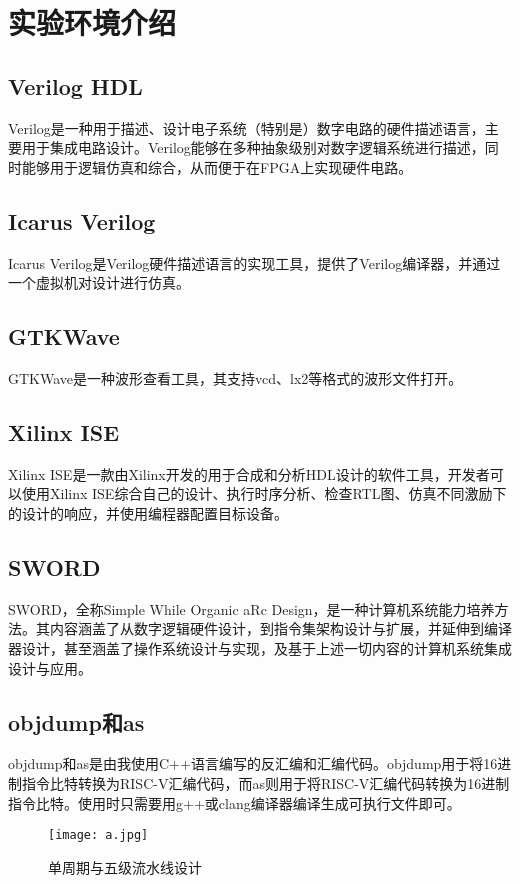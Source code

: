 \documentclass{article}
\begin{document}
    \section{实验环境介绍}
        \subsection{Verilog HDL}
        Verilog是一种用于描述、设计电子系统（特别是）数字电路的硬件描述语言，主要用于集成电路设计。Verilog能够在多种抽象级别对数字逻辑系统进行描述，同时能够用于逻辑仿真和综合，从而便于在FPGA上实现硬件电路。\cite{ref4}
        \subsection{Icarus Verilog}
        Icarus Verilog是Verilog硬件描述语言的实现工具，提供了Verilog编译器，并通过一个虚拟机对设计进行仿真。\cite{ref5}
        \subsection{GTKWave}
        GTKWave是一种波形查看工具，其支持vcd、lx2等格式的波形文件打开。
        \subsection{Xilinx ISE}
        Xilinx ISE是一款由Xilinx开发的用于合成和分析HDL设计的软件工具，开发者可以使用Xilinx ISE综合自己的设计、执行时序分析、检查RTL图、仿真不同激励下的设计的响应，并使用编程器配置目标设备。\cite{ref6}
        \subsection{SWORD}
        SWORD，全称Simple While Organic aRc Design，是一种计算机系统能力培养方法。其内容涵盖了从数字逻辑硬件设计，到指令集架构设计与扩展，并延伸到编译器设计，甚至涵盖了操作系统设计与实现，及基于上述一切内容的计算机系统集成设计与应用。\cite{ref7}
        \subsection{objdump和as}
        objdump和as是由我使用C++语言编写的反汇编和汇编代码。objdump用于将16进制指令比特转换为RISC-V汇编代码，而as则用于将RISC-V汇编代码转换为16进制指令比特。使用时只需要用g++或clang编译器编译生成可执行文件即可。

    \newpage{}
    \begin{figure}[ht]
        \centering
        \texttt{[image: a.jpg]}
        \caption{单周期与五级流水线设计}
    \end{figure}
\end{document}
